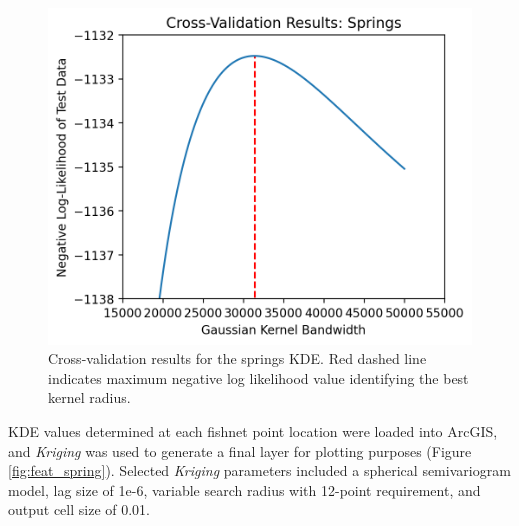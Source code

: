 \begin{figure}[H]
\centering
\includegraphics[scale=.60]{templates/images/Figure-Springs_kde_gridsearchcv_result.png}
\singlespacing
\caption[Spring density parameter tuning]{Cross-validation results for the springs KDE. Red dashed line indicates maximum negative log likelihood value identifying the best kernel radius.}
\label{fig:spring_cv}
\end{figure}

KDE values determined at each fishnet point location were loaded into ArcGIS, and \textit{Kriging} was used to generate a final layer for plotting purposes (Figure \ref{fig:feat_spring}). Selected \textit{Kriging} parameters included a spherical semivariogram model, lag size of 1e-6, variable search radius with 12-point requirement, and output cell size of 0.01.
\vfill
\pagebreak

